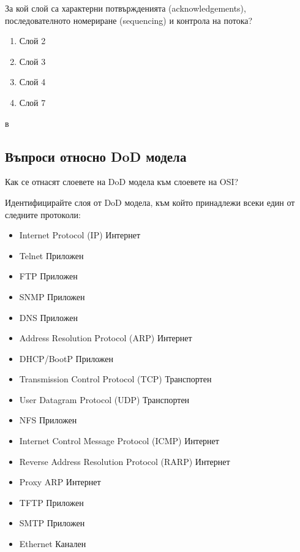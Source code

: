 \begin{q}
  За кой слой са характерни потвържденията (acknowledgements), последователното
  номериране (sequencing) и контрола на потока?

  \begin{enumerate}
  \item Слой 2
  \item Слой 3
  \item Слой 4
  \item Слой 7
  \end{enumerate}

  \rans в
\end{q}

\subsection{Въпроси относно DoD модела}
\begin{q}
  Как се отнасят слоевете на DoD модела към слоевете на OSI?
\end{q}

\begin{q}
  Идентифицирайте слоя от DoD модела, към който принадлежи всеки един от
  следните протоколи:

  \begin{itemize}
  \item Internet Protocol (IP) \rans Интернет
  \item Telnet \rans Приложен
  \item FTP \rans Приложен
  \item SNMP \rans Приложен
  \item DNS \rans Приложен
  \item Address Resolution Protocol (ARP) \rans Интернет
  \item DHCP/BootP \rans Приложен
  \item Transmission Control Protocol (TCP) \rans Транспортен
  \item User Datagram Protocol (UDP) \rans Транспортен
  \item NFS \rans Приложен
  \item Internet Control Message Protocol (ICMP) \rans Интернет
  \item Reverse Address Resolution Protocol (RARP) \rans Интернет
  \item Proxy ARP \rans Интернет
  \item TFTP \rans Приложен
  \item SMTP \rans Приложен
  \item Ethernet \rans Канален
  \end{itemize}
\end{q}

